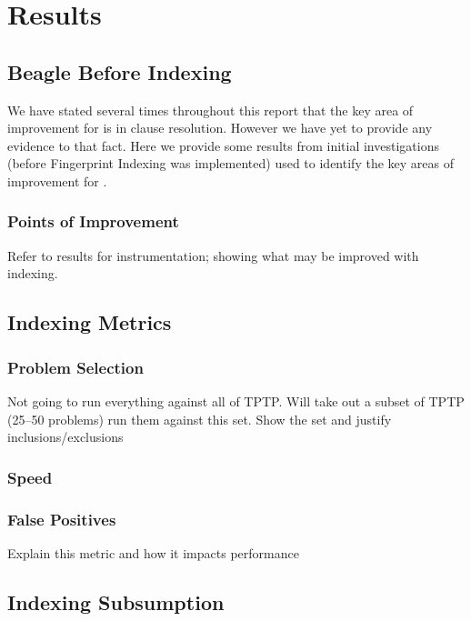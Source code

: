 
\chapter{Results}
\label{cha:results}

\section{Beagle Before Indexing}
\label{sec:preindexing}

We have stated several times throughout this report that the key area of improvement for \beagle
is in clause resolution. However we have yet to provide any evidence to that fact.
Here we provide some results from initial investigations (before Fingerprint Indexing
was implemented) used to identify the key areas of improvement for \beagle.

\subsection{Points of Improvement}

Refer to results for instrumentation; showing what may be improved with indexing.

\section{Indexing Metrics}
\label{sec:metrics}

\subsection{Problem Selection}
Not going to run everything against all of TPTP. Will take out a subset
of TPTP (25--50 problems) run them against this set.
Show the set and justify inclusions/exclusions

\subsection{Speed}

\subsection{False Positives}
Explain this metric and how it impacts performance

\section{Indexing Subsumption}
\label{sec:indexresults}


